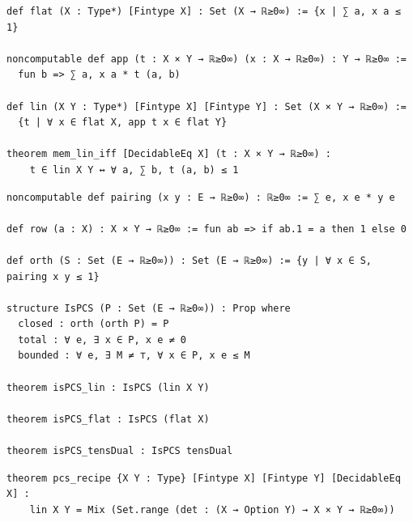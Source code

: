 \label{lean:mem-lin-iff}
\begin{lstlisting}
def flat (X : Type*) [Fintype X] : Set (X → ℝ≥0∞) := {x | ∑ a, x a ≤ 1}

noncomputable def app (t : X × Y → ℝ≥0∞) (x : X → ℝ≥0∞) : Y → ℝ≥0∞ :=
  fun b => ∑ a, x a * t (a, b)

def lin (X Y : Type*) [Fintype X] [Fintype Y] : Set (X × Y → ℝ≥0∞) :=
  {t | ∀ x ∈ flat X, app t x ∈ flat Y}

theorem mem_lin_iff [DecidableEq X] (t : X × Y → ℝ≥0∞) :
    t ∈ lin X Y ↔ ∀ a, ∑ b, t (a, b) ≤ 1
\end{lstlisting}

\label{lean:ispcs-lin}
\begin{lstlisting}
noncomputable def pairing (x y : E → ℝ≥0∞) : ℝ≥0∞ := ∑ e, x e * y e

def row (a : X) : X × Y → ℝ≥0∞ := fun ab => if ab.1 = a then 1 else 0

def orth (S : Set (E → ℝ≥0∞)) : Set (E → ℝ≥0∞) := {y | ∀ x ∈ S, pairing x y ≤ 1}

structure IsPCS (P : Set (E → ℝ≥0∞)) : Prop where
  closed : orth (orth P) = P
  total : ∀ e, ∃ x ∈ P, x e ≠ 0
  bounded : ∀ e, ∃ M ≠ ⊤, ∀ x ∈ P, x e ≤ M

theorem isPCS_lin : IsPCS (lin X Y)

theorem isPCS_flat : IsPCS (flat X)

theorem isPCS_tensDual : IsPCS tensDual
\end{lstlisting}

\label{lean:pcs-recipe}
\begin{lstlisting}
theorem pcs_recipe {X Y : Type} [Fintype X] [Fintype Y] [DecidableEq X] :
    lin X Y = Mix (Set.range (det : (X → Option Y) → X × Y → ℝ≥0∞))
\end{lstlisting}

